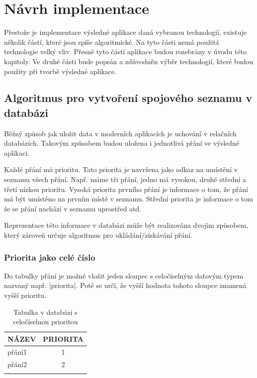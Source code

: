 \section{Návrh implementace}
Přestože je implementace výsledné aplikace daná vybranou technologií, existuje několik částí, které jsou spíše algoritmické. Na tyto části nemá použitá technologie velký vliv. Přesně tyto části aplikace budou rozebrány v úvodu této kapitoly.
Ve druhé části bude popsán a zdůvodněn výběr technologií, které budou použity při tvorbě výsledné aplikace.

\subsection{Algoritmus pro vytvoření spojového seznamu v databázi}
Běžný způsob jak uložit data v moderních aplikacích je uchování v relačních databázích. Takovým způsobem budou uložena i jednotlivá přání ve výsledné aplikaci.

Každé přání má prioritu. Tato priorita je navržena jako odkaz na umístění v seznamu všech přání. Např. máme tři přání, jedno má vysokou, druhé střední a třetí nízkou prioritu. Vysoká priorita prvního přání je informace o tom, že přání má být umístěno na prvním místě v seznamu. Střední priorita je informace o tom že se přání nachází v seznamu uprostřed atd.

Reprezentace této informace v databázi může být realizována dvojím způsobem, který zároveň určuje algoritmus pro ukládání/získávání přání.

\subsubsection{Priorita jako celé číslo}
Do tabulky přání je možné vložit jeden sloupec s celočíselným datovým typem nazvaný např. |priorita|. Poté se určí, že vyšší hodnota tohoto sloupce znamená vyšší prioritu.
\begin{table}[htb]
	\begin{center}
	  \begin{tabular}{ | l | c | }
	    \hline
	    NÁZEV & PRIORITA  \\ \hline \hline
	    přání1 & 1  \\ \hline
	    přání2 & 2 \\ \hline
	     &  \\ \hline
	  \end{tabular}
	  \caption{Tabulka v databázi s celočíselnou prioritou}
	  \label{tab:integer-priority}
	\end{center}
\end{table}


